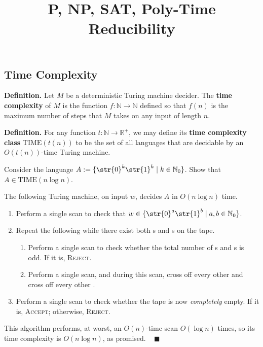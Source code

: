 \title{P, NP, SAT, Poly-Time Reducibility}



\subsection{Time Complexity}

\textbf{Definition.}
Let $M$ be a deterministic Turing machine decider.
The \textbf{time complexity} of $M$ is the function
$f \colon \mathbb{N} \to \mathbb{N}$ defined so that
$f(n)$ is the maximum number of steps that $M$ takes
on any input of length $n$.

\textbf{Definition.}
For any function $t \colon \mathbb{N} \to \mathbb{R}^+$,
we may define its \textbf{time complexity class} $\mathrm{TIME}(t(n))$
to be the set of all languages
that are decidable by an $O(t(n))$-time Turing machine.

\begin{problem}
    Consider the language $A := \{\str{0}^k\str{1}^k \mid k \in \mathbb{N}_0\}$.
    Show that $A \in \mathrm{TIME}(n \log n)$.
\end{problem}

\begin{solution}
    The following Turing machine, on input $w$,
    decides $A$ in $O(n \log n)$ time.
    \begin{enumerate}
        \item Perform a single scan to check that
        $w \in \{\str{0}^a \str{1}^b \mid a, b \in \mathbb{N}_0\}$.
        \item Repeat the following while there exist
        both s and s on the tape.
        \begin{enumerate}
            \item[(a)] Perform a single scan
            to check whether the total number of s and s
            is odd.  If it is, \textsc{Reject}.
            \item[(b)] Perform a single scan, and during this scan,
            cross off every other  and
            cross off every other .
        \end{enumerate}
        \item Perform a single scan to check whether
        the tape is now \emph{completely} empty.
        If it is, \textsc{Accept};
        otherwise, \textsc{Reject}.
    \end{enumerate}
    This algorithm performs, at worst, an $O(n)$-time scan
    $O(\log n)$ times, so its time complexity is $O(n \log n)$, as promised.
    ~ $\blacksquare$
\end{solution}

